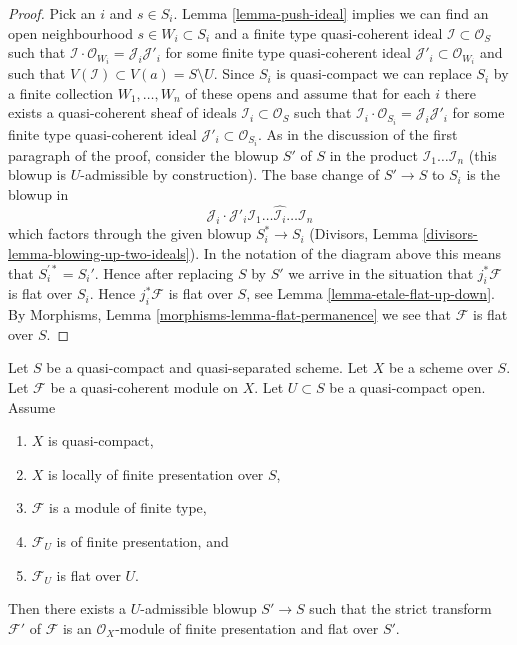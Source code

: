 \begin{proof}
\medskip\noindent
Pick an $i$ and $s \in S_i$. Lemma \ref{lemma-push-ideal}
implies we can find an open neighbourhood $s \in W_i \subset S_i$
and a finite type quasi-coherent ideal $\mathcal{I} \subset \mathcal{O}_S$
such that $\mathcal{I} \cdot \mathcal{O}_{W_i} = \mathcal{J}_i \mathcal{J}'_i$
for some finite type quasi-coherent ideal
$\mathcal{J}'_i \subset \mathcal{O}_{W_i}$
and such that $V(\mathcal{I}) \subset V(a) = S \setminus U$.
Since $S_i$ is quasi-compact we can replace $S_i$ by a finite collection
$W_1, \ldots, W_n$ of these opens and assume that for each $i$ there exists
a quasi-coherent sheaf of ideals $\mathcal{I}_i \subset \mathcal{O}_S$ such
that $\mathcal{I}_i \cdot \mathcal{O}_{S_i} = \mathcal{J}_i \mathcal{J}'_i$
for some finite type quasi-coherent ideal
$\mathcal{J}'_i \subset \mathcal{O}_{S_i}$.
As in the discussion of the first paragraph of the proof, consider the
blowup $S'$ of $S$ in the product $\mathcal{I}_1 \ldots \mathcal{I}_n$
(this blowup is $U$-admissible by construction). The base change of $S' \to S$
to $S_i$ is the blowup in
$$
\mathcal{J}_i \cdot
\mathcal{J}'_i \mathcal{I}_1 \ldots \hat{\mathcal{I}_i} \ldots \mathcal{I}_n
$$
which factors through the given blowup $S_i^* \to S_i$
(Divisors, Lemma \ref{divisors-lemma-blowing-up-two-ideals}). In the notation
of the diagram above this means that $S_i^{\prime *} = S_i'$. Hence
after replacing $S$ by $S'$ we arrive in the situation that
$j_i^*\mathcal{F}$ is flat over $S_i$. Hence $j_i^*\mathcal{F}$ is flat
over $S$, see
Lemma \ref{lemma-etale-flat-up-down}.
By Morphisms, Lemma \ref{morphisms-lemma-flat-permanence}
we see that $\mathcal{F}$ is flat over $S$.
\end{proof}

\begin{theorem}
\label{theorem-flatten-module}
Let $S$ be a quasi-compact and quasi-separated scheme.
Let $X$ be a scheme over $S$.
Let $\mathcal{F}$ be a quasi-coherent module on $X$.
Let $U \subset S$ be a quasi-compact open. Assume
\begin{enumerate}
\item $X$ is quasi-compact,
\item $X$ is locally of finite presentation over $S$,
\item $\mathcal{F}$ is a module of finite type,
\item $\mathcal{F}_U$ is of finite presentation, and
\item $\mathcal{F}_U$ is flat over $U$.
\end{enumerate}
Then there exists a $U$-admissible blowup $S' \to S$ such that the
strict transform $\mathcal{F}'$ of $\mathcal{F}$ is an
$\mathcal{O}_X$-module of finite presentation and flat over $S'$.
\end{theorem}

